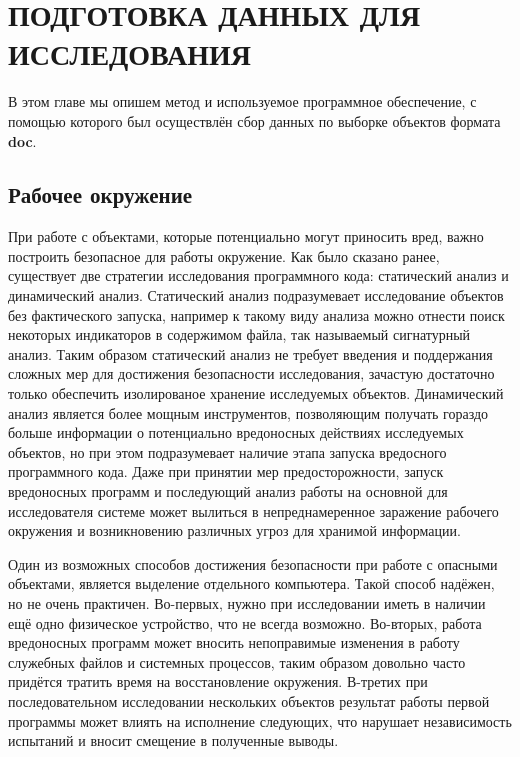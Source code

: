 \chapter{ПОДГОТОВКА ДАННЫХ ДЛЯ ИССЛЕДОВАНИЯ}

В этом главе мы опишем метод и используемое программное обеспечение, с помощью которого был осуществлён сбор данных по выборке объектов формата \textbf{doc}.

\section{Рабочее окружение}

При работе с объектами, которые потенциально могут приносить вред, важно построить безопасное для работы окружение.
Как было сказано ранее, существует две стратегии исследования программного кода: статический анализ и динамический анализ.
Статический анализ подразумевает исследование объектов без фактического запуска, например к такому виду анализа можно отнести поиск некоторых индикаторов в содержимом файла, так называемый сигнатурный анализ.
Таким образом статический анализ не требует введения и поддержания сложных мер для достижения безопасности исследования, зачастую достаточно только обеспечить изолированое хранение исследуемых объектов.
Динамический анализ является более мощным инструментов, позволяющим получать гораздо больше информации о потенциально вредоносных действиях исследуемых объектов, но при этом подразумевает наличие этапа запуска вредосного программного кода.
Даже при принятии мер предосторожности, запуск вредоносных программ и последующий анализ работы на основной для исследователя системе может вылиться в непреднамеренное заражение рабочего окружения и возникновению различных угроз для хранимой информации.

Один из возможных способов достижения безопасности при работе с опасными объектами, является выделение отдельного компьютера.
Такой способ надёжен, но не очень практичен. Во-первых, нужно при исследовании иметь в наличии ещё одно физическое устройство, что не всегда возможно.
Во-вторых, работа вредоносных программ может вносить непоправимые изменения в работу служебных файлов и системных процессов, таким образом довольно часто придётся тратить время на восстановление окружения.
В-третих при последовательном исследовании нескольких объектов результат работы первой программы может влиять на исполнение следующих, что нарушает независимость испытаний и вносит смещение в полученные выводы.

